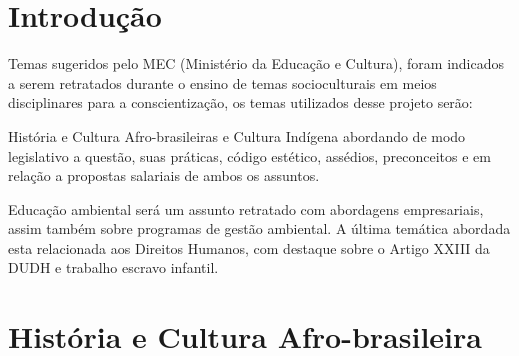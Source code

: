\documentclass[12pt,oneside,a4paper,chapter=TITLE,section=TITLE,sumario
=tradicional]{abntex2}
\begin{document}

\imprimircapa
\imprimirfolhaderosto

\sumario

\textual

\chapter{Introdução}
\label{cap:introducao}

Temas sugeridos pelo MEC (Ministério da Educação e Cultura), foram indicados a
serem retratados durante o ensino de temas socioculturais em meios disciplinares para a conscientização, os temas utilizados desse projeto serão:

História e Cultura Afro-brasileiras e Cultura Indígena  abordando de modo legislativo a questão, suas práticas, código estético, assédios, preconceitos e em relação a propostas salariais de ambos os assuntos.

Educação ambiental será um assunto retratado com abordagens empresariais, assim também sobre programas de gestão ambiental. A última temática abordada esta relacionada aos Direitos Humanos, com destaque sobre o Artigo XXIII da DUDH e trabalho escravo infantil.


\chapter{História e Cultura Afro-brasileira}
\label{cap:historia-e-cultura-afro-brasileira}
\end{document}
